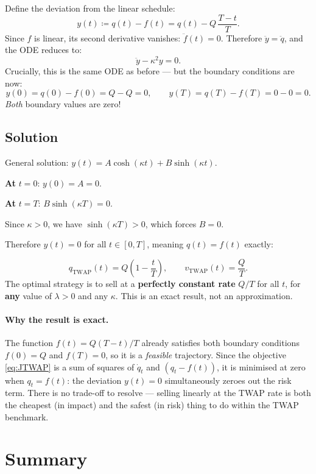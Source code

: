 \documentclass[12pt, a4paper]{article}
\newcommand{\kap}{\kappa}
\begin{document}
Define the deviation from the linear schedule:
\[
  y(t) \coloneqq q(t) - f(t) = q(t) - Q\,\frac{T-t}{T}.
\]
Since $f$ is linear, its second derivative vanishes: $\ddot f(t) = 0$.
Therefore $\ddot y = \ddot q$, and the ODE reduces to:
\[
  \ddot y - \kap^2 y = 0.
\]
Crucially, this is the same ODE as before — but the boundary conditions are now:
\[
  y(0) = q(0) - f(0) = Q - Q = 0, \qquad y(T) = q(T) - f(T) = 0 - 0 = 0.
\]
\emph{Both} boundary values are zero!

\subsection{Solution}

General solution: $y(t) = A\cosh(\kap t) + B\sinh(\kap t)$.

\textbf{At} $t = 0$: $y(0) = A = 0$.

\textbf{At} $t = T$: $B\sinh(\kap T) = 0$.

Since $\kap > 0$, we have $\sinh(\kap T) > 0$, which forces $B = 0$.

Therefore $y(t) = 0$ for all $t \in [0, T]$, meaning $q(t) = f(t)$ exactly:

\begin{resultbox}
\[
  q_{\mathrm{TWAP}}(t) = Q\!\left(1 - \frac{t}{T}\right),
  \qquad
  v_{\mathrm{TWAP}}(t) = \frac{Q}{T}.
\]
The optimal strategy is to sell at a \textbf{perfectly constant rate} $Q/T$
for all $t$, for \textbf{any} value of $\lambda > 0$ and any $\kap$.
This is an exact result, not an approximation.
\end{resultbox}

\paragraph{Why the result is exact.}
The function $f(t) = Q(T-t)/T$ already satisfies both boundary conditions
$f(0) = Q$ and $f(T) = 0$, so it is a \emph{feasible} trajectory.
Since the objective \eqref{eq:JTWAP} is a sum of squares of $\dot q_t$ and
$(q_t - f(t))$, it is minimised at zero when $q_t = f(t)$: the deviation
$y(t) = 0$ simultaneously zeroes out the risk term.
There is no trade-off to resolve — selling linearly at the TWAP rate
is both the cheapest (in impact) and the safest (in risk) thing to do
within the TWAP benchmark.

\section{Summary}
\label{sec:summary}
\end{document}
